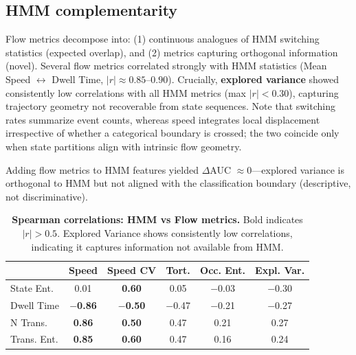 \documentclass[5p,twocolumn,authoryear]{elsarticle}
\begin{document}
\subsection{HMM complementarity}
\label{app:hmm_baseline}

Flow metrics decompose into: (1) continuous analogues of HMM switching statistics (expected overlap), and (2) metrics capturing orthogonal information (novel). Several flow metrics correlated strongly with HMM statistics (Mean Speed $\leftrightarrow$ Dwell Time, $|r| \approx 0.85\text{--}0.90$). Crucially, \textbf{explored variance} showed consistently low correlations with all HMM metrics (max $|r| < 0.30$), capturing trajectory geometry not recoverable from state sequences. Note that switching rates summarize event counts, whereas speed integrates local displacement irrespective of whether a categorical boundary is crossed; the two coincide only when state partitions align with intrinsic flow geometry.

Adding flow metrics to HMM features yielded $\Delta$AUC $\approx 0$---explored variance is orthogonal to HMM but not aligned with the classification boundary (descriptive, not discriminative).

\begin{table}[h]
\centering
\caption{\textbf{Spearman correlations: HMM vs Flow metrics.} Bold indicates $|r| > 0.5$. Explored Variance shows consistently low correlations, indicating it captures information not available from HMM.}
\label{tab:hmm_flow_correlations}
\small
\begin{tabular}{lccccc}
\toprule
& Speed & Speed CV & Tort. & Occ. Ent. & Expl. Var. \\
\midrule
State Ent. & 0.01 & \textbf{0.60} & 0.05 & $-$0.03 & $-$0.30 \\
Dwell Time & \textbf{$-$0.86} & \textbf{$-$0.50} & $-$0.47 & $-$0.21 & $-$0.27 \\
N Trans. & \textbf{0.86} & \textbf{0.50} & 0.47 & 0.21 & 0.27 \\
Trans. Ent. & \textbf{0.85} & \textbf{0.60} & 0.47 & 0.16 & 0.24 \\
\bottomrule
\end{tabular}
\end{table}


\end{document}
